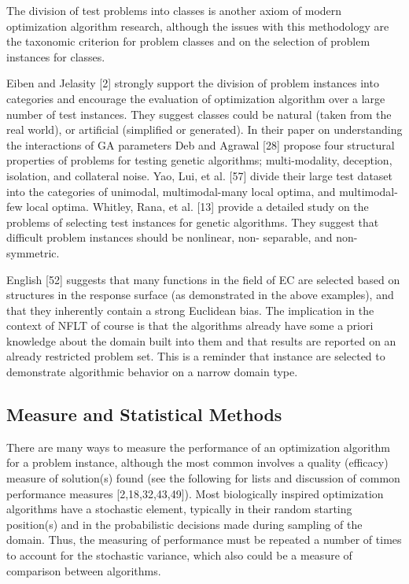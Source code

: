 \documentclass[a4paper, 11pt]{article}
\begin{document}
The division of test problems into classes is another axiom of modern optimization algorithm research, although the issues with this methodology are the taxonomic criterion for problem classes and on the selection of problem instances for classes.

Eiben and Jelasity [2] strongly support the division of problem instances into categories and encourage the evaluation of optimization algorithm over a large number of test instances. They suggest classes could be natural (taken from the real world), or artificial (simplified or generated). In their paper on understanding the interactions of GA parameters Deb and Agrawal [28] propose four structural properties of problems for testing genetic algorithms; multi-modality, deception, isolation, and collateral noise. Yao, Lui, et al. [57] divide their large test dataset into the categories of unimodal,	multimodal-many	local	optima,	and multimodal-few local optima. Whitley, Rana, et al. [13] provide a detailed study on the problems of selecting test instances for genetic algorithms. They suggest that difficult problem instances should be nonlinear, non- separable, and non-symmetric.

English [52] suggests that many functions in the field of EC are selected based on structures in the response surface (as demonstrated in the above examples), and that they inherently contain a strong Euclidean bias. The implication in the context of NFLT of course is that the algorithms already have some a priori knowledge about the domain built into them and that results are reported on an already restricted problem set. This is a reminder that instance are selected to demonstrate algorithmic behavior on a narrow domain type.

% 
% 
\subsection{Measure and Statistical Methods}
There are many ways to measure the performance of an optimization algorithm for a problem instance, although the most common involves a quality (efficacy) measure of solution(s) found (see the following for lists and discussion of common performance measures [2,18,32,43,49]). Most biologically inspired optimization algorithms have a stochastic element, typically in their random starting position(s) and in the probabilistic decisions made during sampling of the domain. Thus, the measuring of performance must be repeated a number of times to account for the stochastic variance, which also could be a measure of comparison between algorithms.
\end{document}
